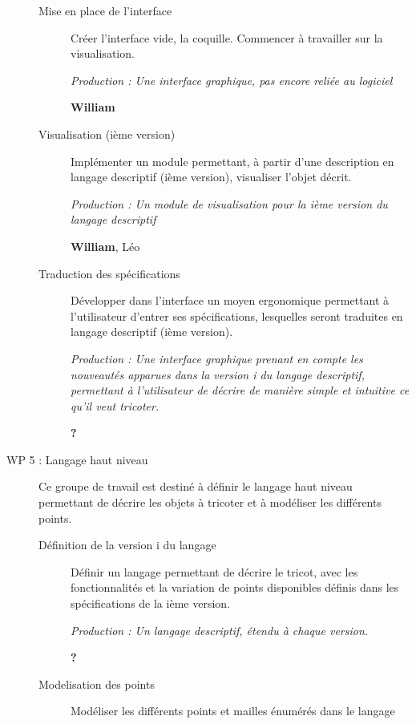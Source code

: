\documentclass{article}
\begin{document}
\begin{description}
  \begin{description}
  \item[Mise en place de l'interface] Créer l'interface vide, la coquille. Commencer à travailler sur la visualisation.

    \textit{Production : Une interface graphique, pas encore reliée au logiciel}

    \textbf{William}
	
  \item[Visualisation (ième version)] Implémenter un module permettant, à partir d'une description en langage descriptif (ième version), 
visualiser l'objet décrit. %

    \textit{Production : Un module de visualisation pour la ième version du langage descriptif}

    \textbf{William}, Léo %

  \item[Traduction des spécifications] Développer dans l'interface un moyen ergonomique permettant à l'utilisateur d'entrer ses 
spécifications, lesquelles seront traduites en langage descriptif (ième version).

    \textit{Production : Une interface graphique prenant en compte les nouveautés apparues dans la version i du langage descriptif, 
permettant à l'utilisateur de décrire de manière simple et intuitive ce qu'il veut tricoter.}

    \textbf{?}
  \end{description}

\medskip


\item[WP 5 : Langage haut niveau] Ce groupe de travail est destiné à définir le langage haut niveau permettant de décrire les objets à tricoter et à modéliser les différents points.


  \begin{description}
  \item[Définition de la version i du langage] Définir un langage permettant de décrire le tricot, avec les fonctionnalités et la 
variation de points disponibles définis dans les spécifications de la ième version.

    \textit{Production : Un langage descriptif, étendu à chaque version.}

    \textbf{?}
\item[Modelisation des points] Modéliser les différents points et mailles énumérés dans le langage 


\end{description}
\end{description}
\end{document}
